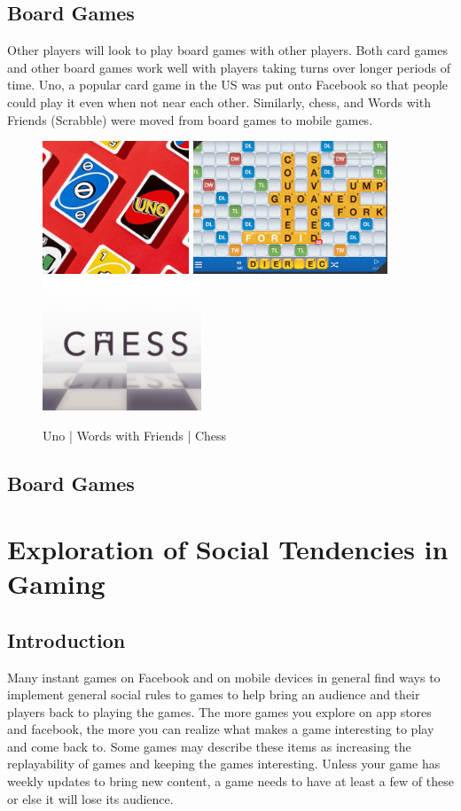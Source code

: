 \documentclass{article}
\begin{document}
\subsection{Board Games}
Other players will look to play board games with other players. Both card games and other board games work well with players taking turns over longer periods of time. Uno, a popular card game in the US was put onto Facebook so that people could play it even when not near each other. Similarly, chess, and Words with Friends (Scrabble) were moved from board games to mobile games.
\begin{figure}[h]
\centering
\includegraphics[height = 150px]{images/uno.png}
\includegraphics[height = 150px]{images/wordswfriends.png}
\includegraphics[height = 150px]{images/chess.png}
\caption{Uno | Words with Friends | Chess}
\end{figure}
\subsection{Board Games}

\section{Exploration of Social Tendencies in Gaming}
\subsection{Introduction}
Many instant games on Facebook and on mobile devices in general find ways to implement general social rules to games to help bring an audience and their players back to playing the games. The more games you explore on app stores and facebook, the more you can realize what makes a game interesting to play and come back to. Some games may describe these items as increasing the replayability of games and keeping the games interesting. Unless your game has weekly updates to bring new content, a game needs to have at least a few of these or else it will lose its audience.
\end{document}

